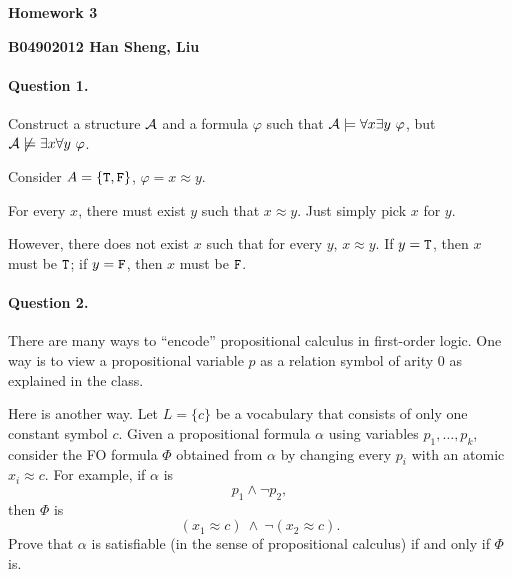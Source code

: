 \documentclass[11pt, a4paper]{article}
\renewcommand{\fulltitle}{Homework 3}
\begin{document}
\date{}



\begin{center}
{\Large {\bf \fulltitle}}
\end{center}
\hfill{\bf B04902012 Han Sheng, Liu}
\vspace{0.7cm}


\paragraph*{Question 1.}
Construct a structure $\mathcal{A}$ and a formula $\varphi$ such that
$\cA \models \forall x \exists y \ \varphi$,
but $\mathcal{A} \not\models \exists x \forall y \ \varphi$.
\begin{framed}
\solution

Consider $A=\{{\tt T}, {\tt F}\}$, $\varphi=x\approx y$. 

For every $x$, there must exist $y$ such that $x \approx y$.
Just simply pick $x$ for $y$.

However, there does not exist $x$ such that for every $y$, $x\approx y$.
If $y={\tt T}$, then $x$ must be ${\tt T}$; if $y={\tt F}$, then $x$ must be ${\tt F}$.
\end{framed}



\paragraph*{Question 2.}
There are many ways to ``encode''
propositional calculus in first-order logic.
One way is to view a propositional variable $p$ as
a relation symbol of arity $0$
as explained in the class.

Here is another way.
Let $L = \{c\}$ be a vocabulary that consists of only one
constant symbol $c$.
Given a propositional formula $\alpha$ 
using variables $p_1,\ldots,p_k$,
consider the FO formula $\Phi$
obtained from $\alpha$ by 
changing every $p_i$ with an atomic $x_i \approx c$.
For example, if $\alpha$ is 
$$p_1\wedge \neg p_2,$$
then $\Phi$ is 
$$
(x_1 \approx c) \ \wedge \ \neg (x_2 \approx c).
$$
Prove that
$\alpha$ is satisfiable (in the sense of propositional calculus)
if and only if $\Phi$ is.
\end{document}
